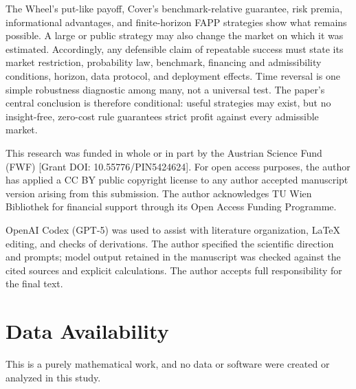 \documentclass[aps,pra,reprint,superscriptaddress,amsmath,amssymb,floatfix]{revtex4-2}
\theoremstyle{plain}
\theoremstyle{definition}
\theoremstyle{remark}
\begin{document}
The Wheel's put-like payoff, Cover's benchmark-relative guarantee, risk
premia, informational advantages, and finite-horizon FAPP strategies show what
remains possible. A large or public strategy may also change the market on
which it was estimated. Accordingly, any defensible claim of repeatable
success must state its market restriction, probability law, benchmark,
financing and admissibility conditions, horizon, data protocol, and deployment
effects. Time reversal is one simple robustness diagnostic among many, not a
universal test. The paper's central conclusion is therefore conditional:
useful strategies may exist, but no insight-free, zero-cost rule guarantees
strict profit against every admissible market.

\begin{acknowledgments}
This research was funded in whole or in part by the Austrian Science Fund
(FWF) [Grant DOI: 10.55776/PIN5424624]. For open access purposes, the author
has applied a CC BY public copyright license to any author accepted manuscript
version arising from this submission. The author acknowledges TU Wien
Bibliothek for financial support through its Open Access Funding Programme.

OpenAI Codex (GPT-5) was used to assist with literature organization, LaTeX
editing, and checks of derivations. The author specified the scientific
direction and prompts; model output retained in the manuscript was checked
against the cited sources and explicit calculations. The author accepts full
responsibility for the final text.
\end{acknowledgments}

\section*{Data Availability}
This is a purely mathematical work, and no data or software were created or
analyzed in this study.


\end{document}
